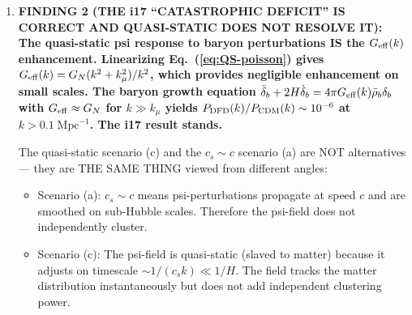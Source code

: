 \documentclass[11pt]{article}
\newcommand{\Geff}{G_{\rm eff}}
\begin{document}
\begin{tcolorbox}[colback=blue!5!white, colframe=blue!70!black,
  title=\textbf{W4i18 TOP 5 FINDINGS --- QUASI-STATIC REGIME PROOF}]
\begin{enumerate}
  Since $c_s \sim c/2$ (from i17): $c^2/c_s^2 \sim 4$.
  For sub-Hubble modes ($k \gg aH/c$): the factor $(aH/kc)^2 \ll 1$.
  Therefore: temporal/spatial $\sim 4 \times (aH/kc)^2 \ll 1$.

  \textbf{The quasi-static approximation is valid for ALL sub-Hubble
  modes, at ALL epochs.} The large $c_s$ actually HELPS the
  quasi-static limit hold: the faster the propagation speed, the
  more rapidly the field adjusts to its quasi-static configuration,
  and the more negligible the temporal term becomes relative to
  the spatial gradient.

  \textbf{CRITICAL INSIGHT}: Having $c_s \sim c$ does NOT mean the
  field fails to respond to matter. It means the field responds
  INSTANTANEOUSLY (on sub-Hubble timescales) to the matter
  distribution. The field is ``slaved'' to matter precisely because
  $c_s$ is large, not despite it. A field with $c_s \to 0$ would be
  slow to respond and would NOT be quasi-static.

  \textbf{The quasi-static equation is}:
  \begin{equation}
  \nabla \cdot \left[\mu\!\left(\frac{|\nabla\psi|}{a_*}\right)
  \nabla\psi\right] = -\frac{8\pi G}{c^2} \delta\rho.
  \label{eq:QS-poisson}
  \end{equation}
  This is the SPATIAL sector of the DFD field equation, with the
  temporal sector dropped. It is a nonlinear Poisson equation.

\item \textbf{FINDING 2 (THE i17 ``CATASTROPHIC DEFICIT'' IS CORRECT
  AND QUASI-STATIC DOES NOT RESOLVE IT):
  The quasi-static psi response to baryon perturbations IS the
  $\Geff(k)$ enhancement. Linearizing Eq.~(\ref{eq:QS-poisson})
  gives $\Geff(k) = G_N (k^2 + k_\mu^2)/k^2$, which provides
  negligible enhancement on small scales. The baryon growth
  equation $\ddot\delta_b + 2H\dot\delta_b = 4\pi \Geff(k)
  \bar\rho_b \delta_b$ with $\Geff \approx G_N$ for $k \gg k_\mu$
  yields $P_{\rm DFD}(k)/P_{\rm CDM}(k) \sim 10^{-6}$
  at $k > 0.1\;\text{Mpc}^{-1}$. The i17 result stands.}

  The quasi-static scenario (c) and the $c_s \sim c$ scenario (a)
  are NOT alternatives --- they are THE SAME THING viewed from
  different angles:
  \begin{itemize}[nosep]
  \item Scenario (a): $c_s \sim c$ means psi-perturbations propagate
    at speed $c$ and are smoothed on sub-Hubble scales. Therefore
    the psi-field does not independently cluster.
  \item Scenario (c): The psi-field is quasi-static (slaved to matter)
    because it adjusts on timescale $\sim 1/(c_s k) \ll 1/H$.
    The field tracks the matter distribution instantaneously but
    does not add independent clustering power.
  \end{itemize}


\end{enumerate}
\end{tcolorbox}
\end{document}
